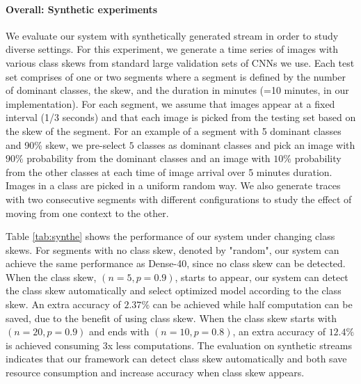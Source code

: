 \documentclass[pageno]{jpaper}
\begin{document}
\paragraph{Overall: Synthetic experiments}
We evaluate our system with synthetically generated stream in order to study diverse settings. For this experiment, we generate a time series of images with various class skews from standard large validation sets of CNNs we use. Each test set comprises of one or two segments where a segment is defined by the number of dominant classes, the skew, and the duration in minutes (=10 minutes, in our implementation). For each segment, we assume that images appear at a fixed interval (1/3 seconds) and that each image is picked from the testing set based on the skew of the segment. For an example of a segment with 5 dominant classes and 90\% skew, we pre-select $5$ classes as dominant classes and pick an image with $90\%$ probability from the dominant classes and an image with $10\%$ probability from the other classes at each time of image arrival over 5 minutes duration. Images in a class are picked in a uniform random way. We also generate traces with two consecutive segments with different configurations to study the effect of moving from one context to the other.



Table \ref{tab:synthe} shows the performance of our system under changing class skews. For segments with no class skew, denoted by "random", our system can achieve the same performance as Dense-40, since no class skew can be detected. When the class skew, $(n=5,p=0.9)$, starts to appear, our system can detect the class skew automatically and select optimized model according to the class skew. An extra accuracy of $2.37\%$ can be achieved while half computation can be saved, due to the benefit of using class skew. When the class skew starts with $(n=20,p=0.9)$ and ends with $(n=10,p=0.8)$, an extra accuracy of $12.4\%$ is achieved consuming $3$x less computations. The evaluation on synthetic streams indicates that our framework can detect class skew automatically and both save resource consumption and increase accuracy when class skew appears.
\end{document}
